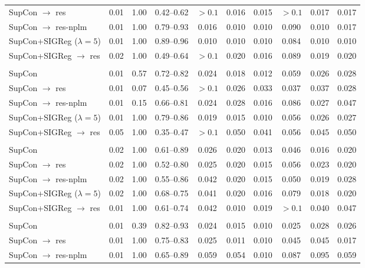 \begin{table}[t]
\begin{tabular}{lccccccccc}
\quad SupCon $\to$ res & 0.01 & 1.00 & 0.42--0.62 & $>0.1$ & 0.016 & 0.015 & $>0.1$ & 0.017 & 0.017 \\
\quad SupCon $\to$ res-nplm & 0.01 & 1.00 & 0.79--0.93 & 0.016 & 0.010 & 0.010 & 0.090 & 0.010 & 0.017 \\
SupCon+SIGReg ($\lambda{=}5$) & 0.01 & 1.00 & 0.89--0.96 & 0.010 & 0.010 & 0.010 & 0.084 & 0.010 & 0.010 \\
\quad SupCon+SIGReg $\to$ res & 0.02 & 1.00 & 0.49--0.64 & $>0.1$ & 0.020 & 0.016 & 0.089 & 0.019 & 0.020 \\
\addlinespace
\multicolumn{10}{l}{\emph{visreg}, all seen labels} \\
SupCon & 0.01 & 0.57 & 0.72--0.82 & 0.024 & 0.018 & 0.012 & 0.059 & 0.026 & 0.028 \\
\quad SupCon $\to$ res & 0.01 & 0.07 & 0.45--0.56 & $>0.1$ & 0.026 & 0.033 & 0.037 & 0.037 & 0.028 \\
\quad SupCon $\to$ res-nplm & 0.01 & 0.15 & 0.66--0.81 & 0.024 & 0.028 & 0.016 & 0.086 & 0.027 & 0.047 \\
SupCon+SIGReg ($\lambda{=}5$) & 0.01 & 1.00 & 0.79--0.86 & 0.019 & 0.015 & 0.010 & 0.056 & 0.026 & 0.027 \\
\quad SupCon+SIGReg $\to$ res & 0.05 & 1.00 & 0.35--0.47 & $>0.1$ & 0.050 & 0.041 & 0.056 & 0.045 & 0.050 \\
\addlinespace
\multicolumn{10}{l}{\emph{dino}, one label (class 2)} \\
SupCon & 0.02 & 1.00 & 0.61--0.89 & 0.026 & 0.020 & 0.013 & 0.046 & 0.016 & 0.020 \\
\quad SupCon $\to$ res & 0.02 & 1.00 & 0.52--0.80 & 0.025 & 0.020 & 0.015 & 0.056 & 0.023 & 0.020 \\
\quad SupCon $\to$ res-nplm & 0.02 & 1.00 & 0.55--0.86 & 0.042 & 0.020 & 0.015 & 0.050 & 0.019 & 0.028 \\
SupCon+SIGReg ($\lambda{=}5$) & 0.02 & 1.00 & 0.68--0.75 & 0.041 & 0.020 & 0.016 & 0.079 & 0.018 & 0.020 \\
\quad SupCon+SIGReg $\to$ res & 0.01 & 1.00 & 0.61--0.74 & 0.042 & 0.010 & 0.019 & $>0.1$ & 0.040 & 0.047 \\
\addlinespace
\multicolumn{10}{l}{\emph{dino}, all seen labels} \\
SupCon & 0.01 & 0.39 & 0.82--0.93 & 0.024 & 0.015 & 0.010 & 0.025 & 0.028 & 0.026 \\
\quad SupCon $\to$ res & 0.01 & 1.00 & 0.75--0.83 & 0.025 & 0.011 & 0.010 & 0.045 & 0.045 & 0.017 \\
\quad SupCon $\to$ res-nplm & 0.01 & 1.00 & 0.65--0.89 & 0.059 & 0.054 & 0.010 & 0.087 & 0.095 & 0.059 \\

\end{tabular}
\end{table}

